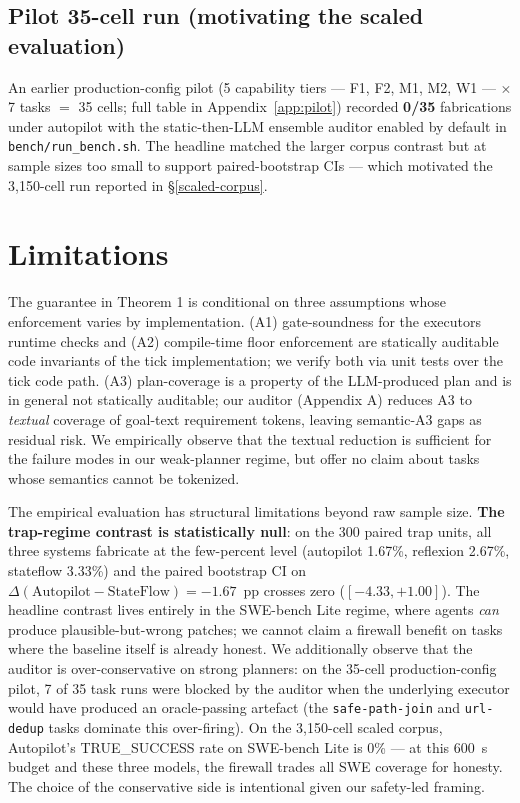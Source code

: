 \subsection{Pilot 35-cell run (motivating the scaled evaluation)}\label{pilot-corpus-motivation}

An earlier production-config pilot (5 capability tiers --- F1, F2, M1, M2, W1 --- $\times$ 7 tasks $=$ 35 cells; full table in
Appendix~\ref{app:pilot}) recorded \textbf{0/35} fabrications under autopilot with the static-then-LLM
ensemble auditor enabled by default in \texttt{bench/run\_bench.sh}. The headline matched the larger
corpus contrast but at sample sizes too small to support paired-bootstrap CIs --- which motivated
the 3{,}150-cell run reported in \S\ref{scaled-corpus}.

\section{Limitations}\label{limitations}

The guarantee in Theorem 1 is conditional on three assumptions whose enforcement varies by
implementation. (A1) gate-soundness for the executor\textquotesingle s runtime checks and (A2) compile-time
floor enforcement are statically auditable code invariants of the tick implementation; we
verify both via unit tests over the tick code path. (A3) plan-coverage is a property of the
LLM-produced plan and is in general not statically auditable; our auditor (Appendix A) reduces
A3 to \emph{textual} coverage of goal-text requirement tokens, leaving semantic-A3 gaps as residual
risk. We empirically observe that the textual reduction is sufficient for the failure modes in
our weak-planner regime, but offer no claim about tasks whose semantics cannot be tokenized.

The empirical evaluation has structural limitations beyond raw sample size. \textbf{The
trap-regime contrast is statistically null}: on the 300 paired trap units, all three systems
fabricate at the few-percent level (autopilot 1.67\%, reflexion 2.67\%, stateflow 3.33\%) and
the paired bootstrap CI on $\Delta(\text{Autopilot} - \text{StateFlow}) = -1.67$~pp crosses
zero ($[-4.33, +1.00]$). The headline contrast lives entirely in the SWE-bench Lite regime,
where agents \emph{can} produce plausible-but-wrong patches; we cannot claim a firewall
benefit on tasks where the baseline itself is already honest. We additionally observe
that the auditor is over-conservative on strong planners: on the 35-cell production-config
pilot, 7 of 35 task runs were blocked by the auditor when the underlying executor would
have produced an oracle-passing artefact (the \texttt{safe-path-join} and \texttt{url-dedup}
tasks dominate this over-firing). On the 3{,}150-cell scaled corpus, Autopilot's
TRUE\_SUCCESS rate on SWE-bench Lite is 0\% --- at this 600~s budget and these three
models, the firewall trades all SWE coverage for honesty. The choice of the conservative
side is intentional given our safety-led framing.

